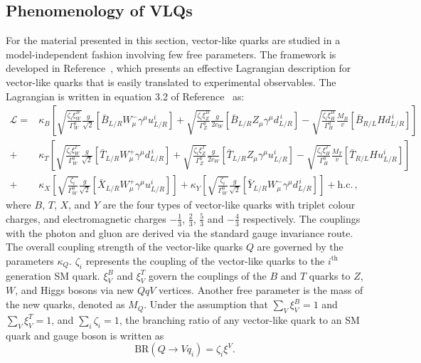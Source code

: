 \subsection{Phenomenology of VLQs}
For the material presented in this section, vector-like quarks are studied in a model-independent fashion involving few free parameters. The framework is developed in Reference~\cite{}, which presents an effective Lagrangian description for vector-like quarks that is easily translated to experimental observables. The Lagrangian is written in equation 3.2 of Reference~\cite{} as:
\begin{equation}
  \label{eq:vlqlagr}
  \begin{split}
    \mathcal{L} =
    &  \kappa_B \left[
      \sqrt{\frac{\zeta_i\xi^{B}_{W}}{\Gamma^0_{W}}} \frac{g}{\sqrt{2}} [\bar{B}_{L/R} W^-_\mu \gamma^\mu u^i_{L/R}]
      +  \sqrt{\frac{\zeta_i\xi^{B}_{Z}}{\Gamma^0_{Z}}} \frac{g}{2c_W} [\bar{B}_{L/R} Z_\mu \gamma^\mu d^{\,i}_{L/R}]
      -  \sqrt{\frac{\zeta_i\xi^{B}_{H}}{\Gamma^0_{H}}} \frac{M_B}{v} [\bar{B}_{R/L} H d^{\,i}_{L/R}]
    \right] \\
    + &   \kappa_T \left[
      \sqrt{\frac{\zeta_i\xi^{T}_{W}}{\Gamma^0_{W}}} \frac{g}{\sqrt{2}} [\bar{T}_{L/R} W^+_\mu \gamma^\mu d^{\,i}_{L/R}]
      +  \sqrt{\frac{\zeta_i\xi^{T}_{Z}}{\Gamma^0_{Z}}} \frac{g}{2c_W} [\bar{T}_{L/R} Z_\mu \gamma^\mu u^i_{L/R}]
      -  \sqrt{\frac{\zeta_i\xi^{T}_{H}}{\Gamma^0_{H}}} \frac{M_T}{v} [\bar{T}_{R/L} H u^i_{L/R}]
    \right] \\
    +  &  \kappa_X \left[
      \sqrt{\frac{\zeta_i}{\Gamma^0_{W}}} \frac{g}{\sqrt{2}} [\bar{X}_{L/R} W^+_\mu \gamma^\mu u^i_{L/R}]
    \right]
    + \kappa_Y \left[
      \sqrt{\frac{\zeta_i}{\Gamma^0_{W}}} \frac{g}{\sqrt{2}} [\bar{Y}_{L/R} W^-_\mu \gamma^\mu d^{\,i}_{L/R}]
    \right] + \text{h.c.} \, ,
  \end{split}
\end{equation}
where $B$, $T$, $X$, and $Y$ are the four types of vector-like quarks with triplet colour charges, and electromagnetic charges $-\frac{1}{3}$, $\frac{2}{3}$, $\frac{5}{3}$ and $-\frac{4}{3}$ respectively. The couplings with the photon and gluon are derived via the standard gauge invariance route. The overall coupling strength of the vector-like quarks $Q$ are governed by the parameters $\kappa_Q$. $\zeta_i$ represents the coupling of the vector-like quarks to the $i^\text{th}$ generation SM quark. $\xi^B_V$ and $\xi^T_V$ govern the couplings of the $B$ and $T$ quarks to $Z$, $W$, and Higgs bosons via new $QqV$ vertices. Another free parameter is the mass of the new quarks, denoted as $M_Q$. Under the assumption that $\sum_{V} \xi^B_{V} = 1$ and $\sum_{V} \xi^T_{V} = 1$, and $\sum_{i} \zeta_i = 1$, the branching ratio of any vector-like quark to an SM quark and gauge boson is written as
\begin{equation}
    \textrm{BR}(Q \rightarrow Vq_i) = \zeta_i\xi^{V}.
\end{equation}

